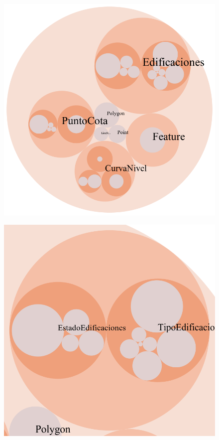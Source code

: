 \begin{figure}[H]
	\centering
	\includegraphics[width=0.7\linewidth]{imagenes/capitulo4/class-hierarchy-TFM}
	\caption{}
	\label{fig:class-hierarchy-tfm}
\end{figure}


\begin{figure}[H]
	\centering
	\includegraphics[width=0.7\linewidth]{imagenes/capitulo4/class-hierarchy-TFM-2}
	\caption{}
	\label{fig:class-hierarchy-tfm-2}
\end{figure}


